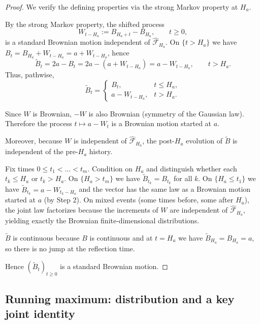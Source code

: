 \begin{proof}
We verify the defining properties via the strong Markov property at $H_a$.

\medskip
{}

By the strong Markov property, the shifted process
\[
W_{t-H_a}:=B_{H_a+t}-B_{H_a},\qquad t\ge0,
\]
is a standard Brownian motion independent of $\widehat{\mathcal F}_{H_a}$.
On $\{t>H_a\}$ we have $B_t=B_{H_a}+W_{t-H_a}=a+W_{t-H_a}$, hence
\[
\widetilde B_t = 2a - B_t = 2a-(a+W_{t-H_a})=a-W_{t-H_a},\qquad t>H_a.
\]
Thus, pathwise,
\[
\widetilde B_t=
\begin{cases}
B_t, & t\le H_a,\\
a-W_{t-H_a}, & t>H_a.
\end{cases}
\]

\medskip
{}

Since $W$ is Brownian, $-W$ is also Brownian (symmetry of the Gaussian law).
Therefore the process $t\mapsto a-W_t$ is a Brownian motion started at $a$.

Moreover, because $W$ is independent of $\widehat{\mathcal F}_{H_a}$, the post-$H_a$ evolution of
$\widetilde B$ is independent of the pre-$H_a$ history.

\medskip
{}

Fix times $0\le t_1<\dots<t_m$. Condition on $H_a$ and distinguish whether each $t_k\le H_a$ or $t_k>H_a$.
On $\{H_a>t_m\}$ we have $\widetilde B_{t_k}=B_{t_k}$ for all $k$.
On $\{H_a\le t_1\}$ we have $\widetilde B_{t_k}=a-W_{t_k-H_a}$ and the vector has the same law as a Brownian
motion started at $a$ (by Step 2).
On mixed events (some times before, some after $H_a$), the joint law factorizes because the increments of $W$
are independent of $\widehat{\mathcal F}_{H_a}$, yielding exactly the Brownian finite-dimensional distributions.

\medskip
{}

$\widetilde B$ is continuous because $B$ is continuous and at $t=H_a$ we have $\widetilde B_{H_a}=B_{H_a}=a$,
so there is no jump at the reflection time.

Hence $(\widetilde B_t)_{t\ge0}$ is a standard Brownian motion.
\end{proof}

\subsection{Running maximum: distribution and a key joint identity}

